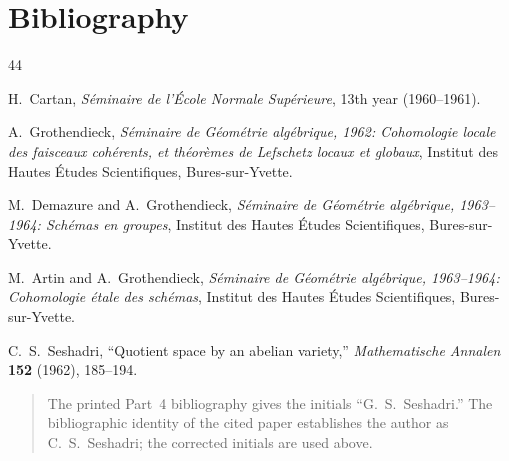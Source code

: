 \clearpage
{}
{}
\section*{Bibliography}

\begin{thebibliography}{44}

H.~Cartan, \emph{S\'eminaire de l'\'Ecole Normale Sup\'erieure},
13th year (1960--1961).

A.~Grothendieck, \emph{S\'eminaire de G\'eom\'etrie alg\'ebrique, 1962:
Cohomologie locale des faisceaux coh\'erents, et th\'eor\`emes de Lefschetz
locaux et globaux}, Institut des Hautes \'Etudes Scientifiques,
Bures-sur-Yvette.

M.~Demazure and A.~Grothendieck, \emph{S\'eminaire de G\'eom\'etrie
alg\'ebrique, 1963--1964: Sch\'emas en groupes}, Institut des Hautes
\'Etudes Scientifiques, Bures-sur-Yvette.

M.~Artin and A.~Grothendieck, \emph{S\'eminaire de G\'eom\'etrie
alg\'ebrique, 1963--1964: Cohomologie \'etale des sch\'emas}, Institut des
Hautes \'Etudes Scientifiques, Bures-sur-Yvette.

C.~S.~Seshadri, ``Quotient space by an abelian variety,''
\emph{Mathematische Annalen} \textbf{152} (1962), 185--194.

\end{thebibliography}

\begin{quote}\footnotesize
The printed Part~4 bibliography gives the initials ``G.~S.~Seshadri.''
The bibliographic identity of the cited paper establishes the author as
C.~S.~Seshadri; the corrected initials are used above.
\end{quote}
